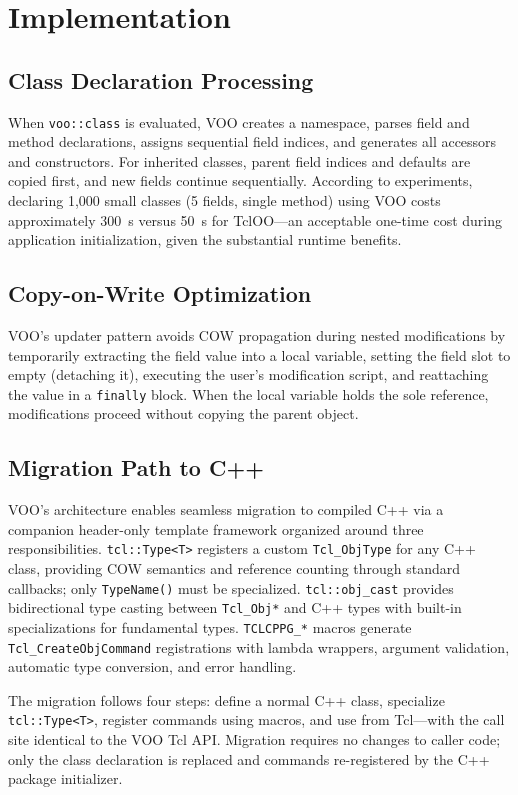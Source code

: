 \section{Implementation}
\label{sec:impl}

\subsection{Class Declaration Processing}

When \texttt{voo::class} is evaluated, VOO creates a namespace, parses field and method
declarations, assigns sequential field indices, and generates all accessors and
constructors. For inherited classes, parent field indices and defaults are copied first,
and new fields continue sequentially. According to experiments, declaring 1,000 small classes (5 fields, single method) using VOO costs approximately 300~\textmu s
versus 50~\textmu s for TclOO---an acceptable one-time cost during application
initialization, given the substantial runtime benefits.

\subsection{Copy-on-Write Optimization}

VOO's updater pattern avoids COW propagation during nested modifications by temporarily
extracting the field value into a local variable, setting the field slot to empty
(detaching it), executing the user's modification script, and reattaching the value in
a \texttt{finally} block. When the local variable holds the sole reference, modifications
proceed without copying the parent object.

\subsection{Migration Path to C++}

VOO's architecture enables seamless migration to compiled C++ via a companion
header-only template framework organized around three responsibilities.
\texttt{tcl::Type<T>} registers a custom \texttt{Tcl\_ObjType} for any C++ class,
providing COW semantics and reference counting through standard callbacks; only
\texttt{TypeName()} must be specialized. \texttt{tcl::obj\_cast} provides bidirectional
type casting between \texttt{Tcl\_Obj*} and C++ types with built-in specializations for
fundamental types. \texttt{TCLCPPG\_*} macros generate \texttt{Tcl\_CreateObjCommand}
registrations with lambda wrappers, argument validation, automatic type conversion, and
error handling.

The migration follows four steps: define a normal C++ class, specialize
\texttt{tcl::Type<T>}, register commands using macros, and use from Tcl---with the call
site identical to the VOO Tcl API\@. Migration requires no changes to caller code; only
the class declaration is replaced and commands re-registered by the C++ package
initializer.
